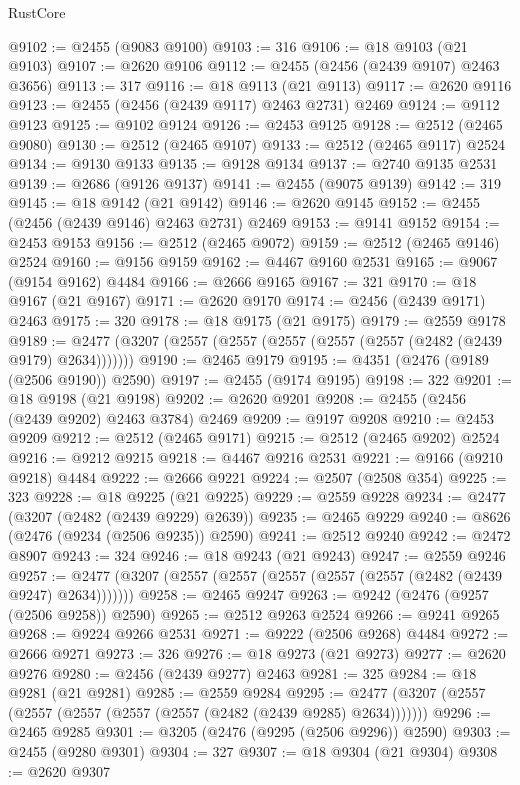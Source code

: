 \begin{lexlean}{RustCore}
\begin{coremodule}
@9102 := @2455 (@9083 @9100)
@9103 := 316
@9106 := @18 @9103 (@21 @9103)
@9107 := @2620 @9106
@9112 := @2455 (@2456 (@2439 @9107) @2463 @3656)
@9113 := 317
@9116 := @18 @9113 (@21 @9113)
@9117 := @2620 @9116
@9123 := @2455 (@2456 (@2439 @9117) @2463 @2731) @2469
@9124 := @9112 @9123
@9125 := @9102 @9124
@9126 := @2453 @9125
@9128 := @2512 (@2465 @9080)
@9130 := @2512 (@2465 @9107)
@9133 := @2512 (@2465 @9117) @2524
@9134 := @9130 @9133
@9135 := @9128 @9134
@9137 := @2740 @9135 @2531
@9139 := @2686 (@9126 @9137)
@9141 := @2455 (@9075 @9139)
@9142 := 319
@9145 := @18 @9142 (@21 @9142)
@9146 := @2620 @9145
@9152 := @2455 (@2456 (@2439 @9146) @2463 @2731) @2469
@9153 := @9141 @9152
@9154 := @2453 @9153
@9156 := @2512 (@2465 @9072)
@9159 := @2512 (@2465 @9146) @2524
@9160 := @9156 @9159
@9162 := @4467 @9160 @2531
@9165 := @9067 (@9154 @9162) @4484
@9166 := @2666 @9165
@9167 := 321
@9170 := @18 @9167 (@21 @9167)
@9171 := @2620 @9170
@9174 := @2456 (@2439 @9171) @2463
@9175 := 320
@9178 := @18 @9175 (@21 @9175)
@9179 := @2559 @9178
@9189 := @2477 (@3207 (@2557 (@2557 (@2557 (@2557 (@2557 (@2482 (@2439 @9179) @2634)))))))
@9190 := @2465 @9179
@9195 := @4351 (@2476 (@9189 (@2506 @9190)) @2590)
@9197 := @2455 (@9174 @9195)
@9198 := 322
@9201 := @18 @9198 (@21 @9198)
@9202 := @2620 @9201
@9208 := @2455 (@2456 (@2439 @9202) @2463 @3784) @2469
@9209 := @9197 @9208
@9210 := @2453 @9209
@9212 := @2512 (@2465 @9171)
@9215 := @2512 (@2465 @9202) @2524
@9216 := @9212 @9215
@9218 := @4467 @9216 @2531
@9221 := @9166 (@9210 @9218) @4484
@9222 := @2666 @9221
@9224 := @2507 (@2508 @354)
@9225 := 323
@9228 := @18 @9225 (@21 @9225)
@9229 := @2559 @9228
@9234 := @2477 (@3207 (@2482 (@2439 @9229) @2639))
@9235 := @2465 @9229
@9240 := @8626 (@2476 (@9234 (@2506 @9235)) @2590)
@9241 := @2512 @9240
@9242 := @2472 @8907
@9243 := 324
@9246 := @18 @9243 (@21 @9243)
@9247 := @2559 @9246
@9257 := @2477 (@3207 (@2557 (@2557 (@2557 (@2557 (@2557 (@2482 (@2439 @9247) @2634)))))))
@9258 := @2465 @9247
@9263 := @9242 (@2476 (@9257 (@2506 @9258)) @2590)
@9265 := @2512 @9263 @2524
@9266 := @9241 @9265
@9268 := @9224 @9266 @2531
@9271 := @9222 (@2506 @9268) @4484
@9272 := @2666 @9271
@9273 := 326
@9276 := @18 @9273 (@21 @9273)
@9277 := @2620 @9276
@9280 := @2456 (@2439 @9277) @2463
@9281 := 325
@9284 := @18 @9281 (@21 @9281)
@9285 := @2559 @9284
@9295 := @2477 (@3207 (@2557 (@2557 (@2557 (@2557 (@2557 (@2482 (@2439 @9285) @2634)))))))
@9296 := @2465 @9285
@9301 := @3205 (@2476 (@9295 (@2506 @9296)) @2590)
@9303 := @2455 (@9280 @9301)
@9304 := 327
@9307 := @18 @9304 (@21 @9304)
@9308 := @2620 @9307

\end{coremodule}
\end{lexlean}

